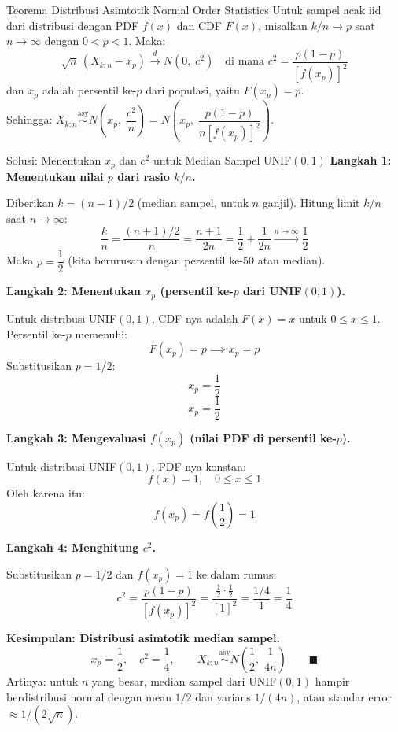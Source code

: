 \documentclass[10pt,twoside]{article}
\begin{document}
\begin{tipbox}{Teorema Distribusi Asimtotik Normal Order Statistics}
Untuk sampel acak iid dari distribusi dengan PDF $f(x)$ dan CDF $F(x)$, misalkan $k/n \to p$ saat $n \to \infty$ dengan $0 < p < 1$. Maka:
\[
\sqrt{n}\,(X_{k:n} - x_p) \xrightarrow{d} N\!\left(0,\; c^2\right) \quad \text{di mana } c^2 = \frac{p(1-p)}{[f(x_p)]^2}
\]
dan $x_p$ adalah persentil ke-$p$ dari populasi, yaitu $F(x_p) = p$.\\
Sehingga: $X_{k:n} \stackrel{\mathrm{asy}}{\sim} N\!\left(x_p,\; \dfrac{c^2}{n}\right) = N\!\left(x_p,\; \dfrac{p(1-p)}{n[f(x_p)]^2}\right)$.
\end{tipbox}

\begin{solbox}{Solusi: Menentukan $x_p$ dan $c^2$ untuk Median Sampel UNIF$(0,1)$}
\textbf{Langkah 1: Menentukan nilai $p$ dari rasio $k/n$.}

Diberikan $k = (n+1)/2$ (median sampel, untuk $n$ ganjil). Hitung limit $k/n$ saat $n \to \infty$:
\[
\frac{k}{n} = \frac{(n+1)/2}{n} = \frac{n+1}{2n} = \frac{1}{2} + \frac{1}{2n} \xrightarrow{n \to \infty} \frac{1}{2}
\]
Maka $p = \dfrac{1}{2}$ (kita berurusan dengan persentil ke-50 atau median).

\textbf{Langkah 2: Menentukan $x_p$ (persentil ke-$p$ dari UNIF$(0,1)$).}

Untuk distribusi UNIF$(0, 1)$, CDF-nya adalah $F(x) = x$ untuk $0 \le x \le 1$. Persentil ke-$p$ memenuhi:
\[
F(x_p) = p \implies x_p = p
\]
Substitusikan $p = 1/2$:
\[
x_p = \frac{1}{2}
\]
\[
\boxed{x_p = \frac{1}{2}}
\]

\textbf{Langkah 3: Mengevaluasi $f(x_p)$ (nilai PDF di persentil ke-$p$).}

Untuk distribusi UNIF$(0, 1)$, PDF-nya konstan:
\[
f(x) = 1, \quad 0 \le x \le 1
\]
Oleh karena itu:
\[
f(x_p) = f\left(\frac{1}{2}\right) = 1
\]

\textbf{Langkah 4: Menghitung $c^2$.}

Substitusikan $p = 1/2$ dan $f(x_p) = 1$ ke dalam rumus:
\[
c^2 = \frac{p(1-p)}{[f(x_p)]^2} = \frac{\frac{1}{2} \cdot \frac{1}{2}}{[1]^2} = \frac{1/4}{1} = \frac{1}{4}
\]

\textbf{Kesimpulan: Distribusi asimtotik median sampel.}
\[
\boxed{x_p = \frac{1}{2}, \quad c^2 = \frac{1}{4}, \qquad X_{k:n} \stackrel{\mathrm{asy}}{\sim} N\!\left(\frac{1}{2},\;\frac{1}{4n}\right)} \qquad \blacksquare
\]
Artinya: untuk $n$ yang besar, median sampel dari UNIF$(0,1)$ hampir berdistribusi normal dengan mean $1/2$ dan varians $1/(4n)$, atau standar error $\approx 1/(2\sqrt{n})$.
\end{solbox}
\end{document}
